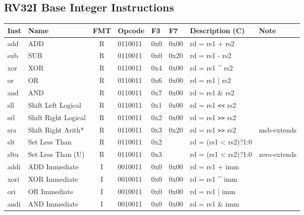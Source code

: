 \subsection*{RV32I Base Integer Instructions}

\begin{tabular}
{T | l | c | T | T | T | T | l} \hline
\rm Inst & Name                    & FMT & \rm Opcode & \rm F3 & \rm F7 & \rm Description (C)          & Note \\ \hline
add      & ADD                     & R   & 0110011    & 0x0    & 0x00   & rd = rs1 + rs2               & \\
sub      & SUB                     & R   & 0110011    & 0x0    & 0x20   & rd = rs1 - rs2               & \\
xor      & XOR                     & R   & 0110011    & 0x4    & 0x00   & rd = rs1 \^{} rs2            & \\
or       & OR                      & R   & 0110011    & 0x6    & 0x00   & rd = rs1 | rs2               & \\
and      & AND                     & R   & 0110011    & 0x7    & 0x00   & rd = rs1 \& rs2              & \\
sll      & Shift Left Logical      & R   & 0110011    & 0x1    & 0x00   & rd = rs1 \verb|<<| rs2       & \\
srl      & Shift Right Logical     & R   & 0110011    & 0x2    & 0x00   & rd = rs1 \verb|>>| rs2       & \\
sra      & Shift Right Arith*      & R   & 0110011    & 0x3    & 0x20   & rd = rs1 \verb|>>| rs2       & msb-extends \\
slt      & Set Less Than           & R   & 0110011    & 0x2    &        & rd = (rs1 < rs2)?1:0         & \\
sltu     & Set Less Than (U)       & R   & 0110011    & 0x3    &        & rd = (rs1 < rs2)?1:0         & zero-extends \\ \hline
addi     & ADD Immediate           & I   & 0010011    & 0x0    & 0x00   & rd = rs1 + imm               & \\
xori     & XOR Immediate           & I   & 0010011    & 0x0    & 0x00   & rd = rs1 \^{} imm            & \\
ori      & OR Immediate            & I   & 0010011    & 0x0    & 0x00   & rd = rs1 | imm               & \\
andi     & AND Immediate           & I   & 0010011    & 0x0    & 0x00   & rd = rs1 \& imm              & \\

\end{tabular}
